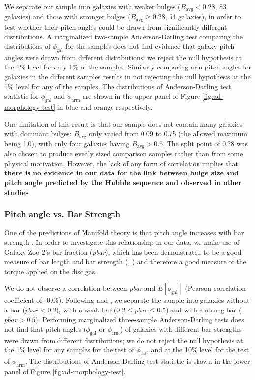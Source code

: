 We separate our sample into galaxies with weaker bulges ($B_\mathrm{avg} < 0.28$, 83 galaxies) and those with stronger bulges ($B_\mathrm{avg} \ge 0.28$, 54 galaxies), in order to test whether their pitch angles could be drawn from significantly different distributions. A marginalized two-sample Anderson-Darling test comparing the distributions of $\phi_\mathrm{gal}$ for the samples does not find evidence that galaxy pitch angles were drawn from different distributions: we reject the null hypothesis at the 1\% level for only 1\% of the samples. Similarly comparing arm pitch angles for galaxies in the different samples results in not rejecting the null hypothesis at the 1\% level for any of the samples. The distributions of Anderson-Darling test statistic for $\phi_\mathrm{gal}$ and $\phi_\mathrm{arm}$ are shown in the upper panel of Figure \ref{fig:ad-morphology-test} in blue and orange respectively.

One limitation of this result is that our sample does not contain many galaxies with dominant bulges: $B_\mathrm{avg}$ only varied from 0.09 to 0.75 (the allowed maximum being 1.0), with only four galaxies having $B_\mathrm{avg} > 0.5$. The split point of 0.28 was also chosen to produce evenly sized comparison samples rather than from some physical motivation. However, the lack of any form of correlation implies that \textbf{there is no evidence in our data for the link between bulge size and pitch angle predicted by the Hubble sequence and observed in other studies}.

\subsubsection{Pitch angle vs. Bar Strength}

One of the predictions of Manifold theory is that pitch angle increases with bar strength \citep{2009MNRAS.400.1706A}. In order to investigate this relationship in our data, we make use of Galaxy Zoo 2's bar fraction (\textit{pbar}), which has been demonstrated to be a good measure of bar length \citep{Willett2013:1308.3496v2} and bar strength (\citealt{2012MNRAS.423.1485S}, \citealt{2012MNRAS.424.2180M}) and therefore a good measure of the torque applied on the disc gas.

We do not observe a correlation between \textit{pbar} and $E[\phi_\mathrm{gal}]$ (Pearson correlation coefficient of -0.05). Following \citet{2012MNRAS.424.2180M} and \citet{2012MNRAS.423.1485S}, we separate the sample into galaxies without a bar ($\mathrm{\textit{pbar}} < 0.2$), with a weak bar ($0.2 \le \mathrm{\textit{pbar}} \le 0.5$) and with a strong bar ($\mathrm{\textit{pbar}} > 0.5$). Performing marginalized three-sample Anderson-Darling tests does not find that pitch angles ($\phi_\mathrm{gal}$ or $\phi_\mathrm{arm}$) of galaxies with different bar strengths were drawn from different distributions; we do not reject the null hypothesis at the 1\% level for any samples for the test of $\phi_\mathrm{gal}$, and at the 10\% level for the test of $\phi_\mathrm{arm}$. The distributions of Anderson-Darling test statistic is shown in the lower panel of Figure \ref{fig:ad-morphology-test}.

